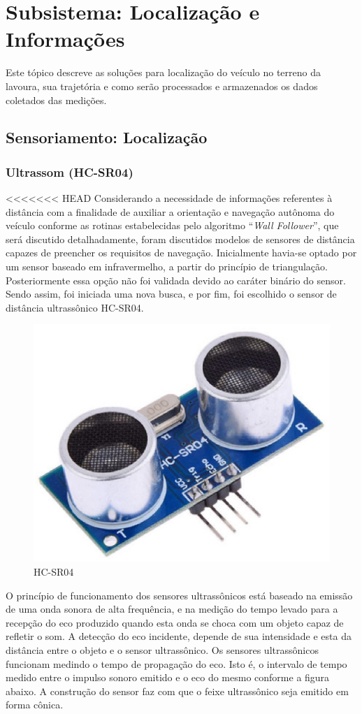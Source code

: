 \section{Subsistema: Localização e Informações}
	Este tópico descreve as soluções para localização do veículo no terreno da lavoura, sua trajetória e
	como serão processados e armazenados os dados coletados das medições.

  \subsection{Sensoriamento: Localização}

  \subsubsection{Ultrassom (HC-SR04)}

<<<<<<< HEAD
Considerando a necessidade de informações referentes à distância com a finalidade de auxiliar a orientação e navegação autônoma do veículo conforme as rotinas estabelecidas pelo algoritmo “\textit{Wall Follower}”, que será discutido detalhadamente, foram discutidos modelos de sensores de distância capazes de preencher os requisitos de navegação.  Inicialmente havia-se optado por um sensor baseado em infravermelho, a partir do princípio de triangulação. Posteriormente essa opção não foi validada devido ao caráter binário do sensor. Sendo assim, foi iniciada uma nova busca, e por fim, foi escolhido o sensor de distância ultrassônico HC-SR04.

		\begin{figure}[!htbp]
			\begin{center}
				\includegraphics[width=.4\textwidth]{figuras/hcsr04.eps}
				\caption{HC-SR04}
			\end{center}
		\end{figure}

O princípio de funcionamento dos sensores ultrassônicos está baseado na emissão de uma onda sonora de alta frequência, e na medição do tempo levado para a recepção do eco produzido quando esta onda se choca com um objeto capaz de refletir o som.
A detecção do eco incidente, depende de sua intensidade e esta da distância entre o objeto e o sensor ultrassônico. Os sensores ultrassônicos funcionam medindo o tempo de propagação do eco. Isto é, o intervalo de tempo medido entre o impulso sonoro emitido e o eco do mesmo conforme a figura abaixo.
A construção do sensor faz com que o feixe ultrassônico seja emitido em forma cônica.

